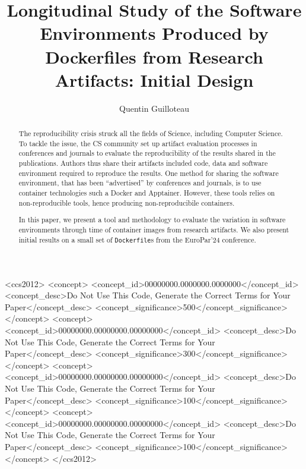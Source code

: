 \documentclass[sigconf,natbib=false]{acmart}
\newcommand{\df}{\texttt{Dockerfile}}
\begin{document}
\title{%
  Longitudinal Study of the Software Environments Produced by Dockerfiles from Research Artifacts: Initial Design%
}

\author{Quentin Guilloteau}


\begin{abstract}
  The reproducibility crisis struck all the fields of Science, including Computer Science.
  To tackle the issue, the CS community set up artifact evaluation processes in conferences and journals to evaluate the reproducibility of the results shared in the publications.
  Authors thus share their artifacts included code, data and software environment required to reproduce the results.
  One method for sharing the software environment, that has been ``advertised'' by conferences and journals, is to use container technologies such a Docker and Apptainer.
  However, these tools relies on non-reproducible tools, hence producing non-reproducibile containers.

  In this paper, we present a tool and methodology to evaluate the variation in software environments through time of container images from research artifacts.
  We also present initial results on a small set of \df s from the EuroPar'24 conference.
\end{abstract}

\begin{CCSXML}
<ccs2012>
 <concept>
  <concept_id>00000000.0000000.0000000</concept_id>
  <concept_desc>Do Not Use This Code, Generate the Correct Terms for Your Paper</concept_desc>
  <concept_significance>500</concept_significance>
 </concept>
 <concept>
  <concept_id>00000000.00000000.00000000</concept_id>
  <concept_desc>Do Not Use This Code, Generate the Correct Terms for Your Paper</concept_desc>
  <concept_significance>300</concept_significance>
 </concept>
 <concept>
  <concept_id>00000000.00000000.00000000</concept_id>
  <concept_desc>Do Not Use This Code, Generate the Correct Terms for Your Paper</concept_desc>
  <concept_significance>100</concept_significance>
 </concept>
 <concept>
  <concept_id>00000000.00000000.00000000</concept_id>
  <concept_desc>Do Not Use This Code, Generate the Correct Terms for Your Paper</concept_desc>
  <concept_significance>100</concept_significance>
 </concept>
</ccs2012>
\end{CCSXML}
\end{document}
